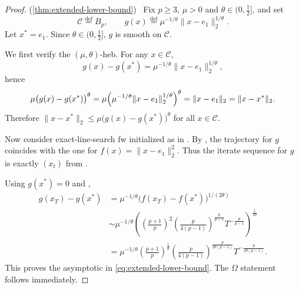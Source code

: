 \documentclass{article}
\newcommand{\C}{\mathcal{C}}
\newcommand{\defi}{\stackrel{\mathrm{\scriptscriptstyle def}}{=}}
\newcommand{\newtarget}[1]{\hypertarget{#1}{}}
\newcommand\linkofproof[1]{(\cref{#1})\newtarget{proof:#1}\ }
\begin{document}
\extendedLowerBound*
\begin{proof}\linkofproof{thm:extended-lower-bound}
    Fix $p\ge 3$, $\mu>0$ and $\theta\in(0,\tfrac12]$, and set
    \[
        \C\defi B_p,\qquad
        g(x)\defi \mu^{-1/\theta}\|x-e_1\|_2^{1/\theta}.
    \]
    Let $x^*=e_1$. Since $\theta\in(0,\tfrac12]$, $g$ is smooth on $\C$.

    We first verify the $(\mu,\theta)$-\gls{heb}. For any $x\in\C$,
    \[
        g(x)-g(x^*)
        =\mu^{-1/\theta}\|x-e_1\|_2^{1/\theta},
    \]
    hence
    \[
        \mu\bigl(g(x)-g(x^*)\bigr)^\theta
        =\mu\Bigl(\mu^{-1/\theta}\|x-e_1\|_2^{1/\theta}\Bigr)^\theta
        =\|x-e_1\|_2
        =\|x-x^*\|_2.
    \]
    Therefore $\|x-x^*\|_2\le \mu\bigl(g(x)-g(x^*)\bigr)^\theta$ for all $x\in\C$.

    Now consider exact-line-search \gls{fw} initialized as in . By , the trajectory for $g$ coincides with the one for $f(x)=\|x-e_1\|_2^2$. Thus the iterate sequence for $g$ is exactly $(x_t)$ from .

    Using $g(x^*)=0$ and ,
    \begin{align*}
        g(x_T)-g(x^*)
        &=\mu^{-1/\theta}\bigl(f(x_T)-f(x^*)\bigr)^{1/(2\theta)}\\
        &\sim
        \mu^{-1/\theta}
        \left(\left(\frac{p+1}{p}\right)^2
        \left(\frac{p}{4(p-1)}\right)^{\frac{p}{p-1}}
        T^{-\frac{p}{p-1}}\right)^{\frac{1}{2\theta}}\\
        &=
        \mu^{-1/\theta}\left(\frac{p+1}{p}\right)^{\frac{1}{\theta}}
        \left(\frac{p}{4(p-1)}\right)^{\frac{p}{2\theta(p-1)}}
        T^{-\frac{p}{2\theta(p-1)}}.
    \end{align*}
    This proves the asymptotic in \eqref{eq:extended-lower-bound}. The $\Omega$ statement follows immediately.
\end{proof}
\end{document}
